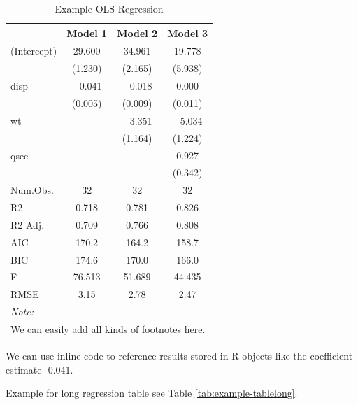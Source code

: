 \documentclass[
  12pt,
]{article}
\begin{document}
\begin{table}

\caption{\label{tab:example-table}Example OLS Regression}
\centering
\begin{tabular}[t]{lccc}
\toprule
  & Model 1 & Model 2 & Model 3\\
\midrule
(Intercept) & \num{29.600} & \num{34.961} & \num{19.778}\\
 & (\num{1.230}) & (\num{2.165}) & (\num{5.938})\\
disp & \num{-0.041} & \num{-0.018} & \num{0.000}\\
 & (\num{0.005}) & (\num{0.009}) & (\num{0.011})\\
wt &  & \num{-3.351} & \num{-5.034}\\
 &  & (\num{1.164}) & (\num{1.224})\\
qsec &  &  & \num{0.927}\\
 &  &  & (\num{0.342})\\
\midrule
Num.Obs. & \num{32} & \num{32} & \num{32}\\
R2 & \num{0.718} & \num{0.781} & \num{0.826}\\
R2 Adj. & \num{0.709} & \num{0.766} & \num{0.808}\\
AIC & \num{170.2} & \num{164.2} & \num{158.7}\\
BIC & \num{174.6} & \num{170.0} & \num{166.0}\\
F & \num{76.513} & \num{51.689} & \num{44.435}\\
RMSE & \num{3.15} & \num{2.78} & \num{2.47}\\
\bottomrule
\multicolumn{4}{l}{\rule{0pt}{1em}\textit{Note: }}\\
\multicolumn{4}{l}{\rule{0pt}{1em}We can easily add all kinds of footnotes here.}\\
\end{tabular}
\end{table}

We can use inline code to reference results stored in R objects like the coefficient estimate -0.041.

Example for long regression table see Table \ref{tab:example-tablelong}.
\end{document}
